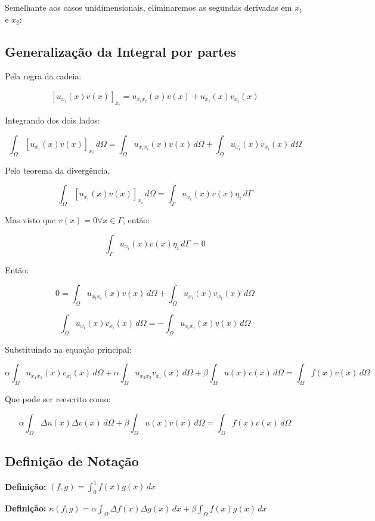  Semelhante aos casos unidimensionais, eliminaremos as segundas derivadas em $x_1$ e $x_2$:

  \subsection*{Generalização da Integral por partes}

  Pela regra da cadeia:

  \[[u_{x_{i}}(x)v(x)]_{x_{i}} = u_{x_{i}x_{i}}(x)v(x) + u_{x_{i}}(x)v_{x_{i}}(x)\]

  Integrando dos dois lados:

  \[\int_{\Omega}[u_{x_{i}}(x)v(x)]_{x_{i}} \, d\Omega = \int_{\Omega} u_{x_{i}x_{i}}(x)v(x) \, d\Omega + \int_{\Omega} u_{x_{i}}(x)v_{x_{i}}(x) \, d\Omega\]

  Pelo teorema da divergência,

  \[\int_{\Omega}[u_{x_{i}}(x)v(x)]_{x_{i}} \, d\Omega = \int_{\Gamma} u_{x_{i}}(x)v(x)\eta_i \, d\Gamma\]

  Mas visto que $v(x) = 0 \forall x \in \Gamma$, então:

  \[\int_{\Gamma} u_{x_{i}}(x)v(x)\eta_i \, d\Gamma = 0\]

  Então:

  \[0 = \int_{\Omega} u_{x_{i}x_{i}}(x)v(x) \, d\Omega + \int_{\Omega} u_{x_{i}}(x)v_{x_{i}}(x) \, d\Omega\]

  \[\int_{\Omega} u_{x_{i}}(x)v_{x_{i}}(x) \, d\Omega = - \int_{\Omega} u_{x_{i}x_{i}}(x)v(x) \, d\Omega\]

  Substituindo na equação principal:

  \[\alpha \int_{\Omega} u_{x_{1}x_{1}}(x)v_{x_{i}}(x) \, d\Omega + \alpha \int_{\Omega} u_{x_{2}x_{2}}v_{x_{i}}(x) \, d\Omega + \beta \int_{\Omega} u(x)v(x) \, d\Omega = \int_{\Omega} f(x)v(x) \, d\Omega\]

  Que pode ser reescrito como:

  \[\alpha \int_{\Omega} \Delta u(x) \Delta v(x) \, d\Omega + \beta \int_{\Omega} u(x)v(x) \, d\Omega = \int_{\Omega} f(x)v(x) \, d\Omega\]


\subsection*{Definição de Notação}

  \textbf{Definição:} $\displaystyle (f,g) = \int_{0}^{1} f(x)g(x) \, dx$

  \textbf{Definição:} $\displaystyle \kappa(f,g) = \alpha \int_{\Omega} \Delta f(x)\Delta g(x) \, dx + \beta \int_{\Omega} f(x)g(x) \, dx$

